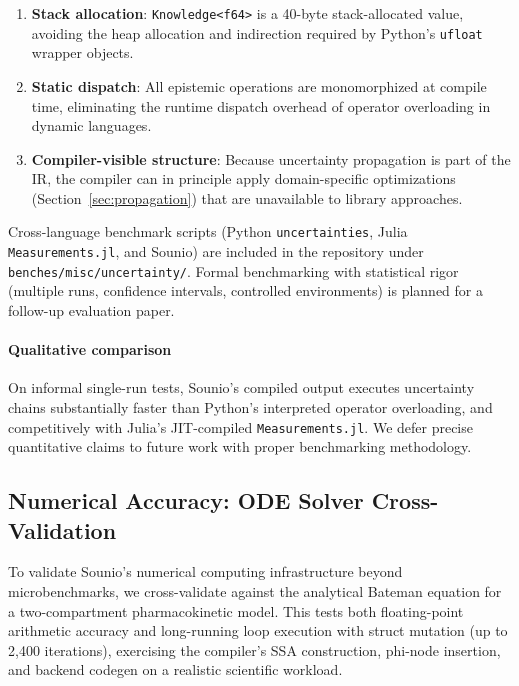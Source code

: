 \documentclass[11pt,a4paper]{article}
\begin{document}
\begin{enumerate}
  \item \textbf{Stack allocation}: \texttt{Knowledge<f64>} is a 40-byte
        stack-allocated value, avoiding the heap allocation and indirection
        required by Python's \texttt{ufloat} wrapper objects.
  \item \textbf{Static dispatch}: All epistemic operations are monomorphized
        at compile time, eliminating the runtime dispatch overhead of
        operator overloading in dynamic languages.
  \item \textbf{Compiler-visible structure}: Because uncertainty propagation
        is part of the IR, the compiler can in principle apply
        domain-specific optimizations (Section~\ref{sec:propagation})
        that are unavailable to library approaches.
\end{enumerate}

Cross-language benchmark scripts (Python \texttt{uncertainties},
Julia \texttt{Measurements.jl}, and Sounio) are included in the repository
under \texttt{benches/misc/uncertainty/}. Formal benchmarking with
statistical rigor (multiple runs, confidence intervals, controlled
environments) is planned for a follow-up evaluation paper.

\paragraph{Qualitative comparison}
On informal single-run tests, Sounio's compiled output executes uncertainty
chains substantially faster than Python's interpreted operator overloading,
and competitively with Julia's JIT-compiled \texttt{Measurements.jl}.
We defer precise quantitative claims to future work with proper
benchmarking methodology.

\subsection{Numerical Accuracy: ODE Solver Cross-Validation}

To validate Sounio's numerical computing infrastructure beyond microbenchmarks,
we cross-validate against the analytical Bateman equation for a two-compartment
pharmacokinetic model. This tests both floating-point arithmetic accuracy and
long-running loop execution with struct mutation (up to 2,400 iterations),
exercising the compiler's SSA construction, phi-node insertion, and backend
codegen on a realistic scientific workload.
\end{document}
